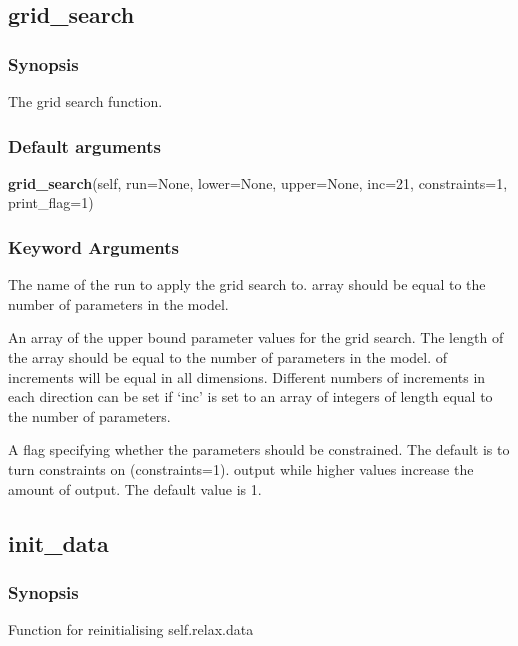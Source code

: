 \newpage

\subsection{grid\_search}


\subsubsection{Synopsis}

The grid search function.

\subsubsection{Default arguments}

\textsf{\textbf{grid\_search}(self, run=None, lower=None, upper=None, inc=21, constraints=1, print\_flag=1)}


\subsubsection{Keyword Arguments}

  The name of the run to apply the grid search to.
array should be equal to the number of parameters in the model.

  An array of the upper bound parameter values for the grid search.  The length of the array should be equal to the number of parameters in the model.
of increments will be equal in all dimensions.  Different numbers of increments in each
direction can be set if `inc' is set to an array of integers of length equal to the number
of parameters.

  A flag specifying whether the parameters should be constrained.  The default is to turn constraints on (constraints=1).
output while higher values increase the amount of output.  The default value is 1.


\newpage

\subsection{init\_data}


\subsubsection{Synopsis}

Function for reinitialising self.relax.data

